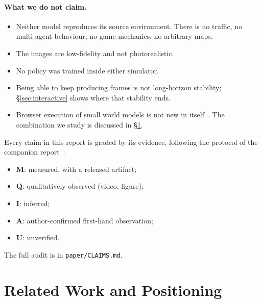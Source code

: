 \documentclass[11pt]{article}
\begin{document}
\paragraph{What we do not claim.}
\begin{itemize}
  \item Neither model reproduces its source environment. There is no traffic, no multi-agent behaviour, no game mechanics, no arbitrary maps.
  \item The images are low-fidelity and not photorealistic.
  \item No policy was trained inside either simulator.
  \item Being able to keep producing frames is not long-horizon stability; \S\ref{sec:interactive} shows where that stability ends.
  \item Browser execution of small world models is not new in itself~\cite{ha2018interactive,boerbohan2025world,kumar2025flappy}. The combination we study is discussed in \S\ref{sec:related}.
\end{itemize}

Every claim in this report is graded by its evidence, following the protocol of the companion report~\cite{kieto2026carla}:
\begin{itemize}
  \item \textbf{M}: measured, with a released artifact;
  \item \textbf{Q}: qualitatively observed (video, figure);
  \item \textbf{I}: inferred;
  \item \textbf{A}: author-confirmed first-hand observation;
  \item \textbf{U}: unverified.
\end{itemize}
The full audit is in \texttt{paper/CLAIMS.md}.

\section{Related Work and Positioning}
\label{sec:related}
\end{document}
